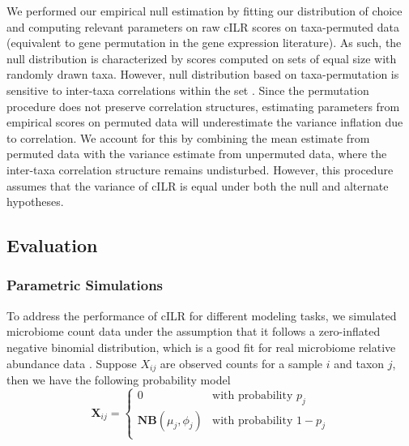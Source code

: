\documentclass[10pt,letterpaper]{article}
\begin{document}
We performed our empirical null estimation by fitting our distribution of choice and computing relevant parameters on raw cILR scores on taxa-permuted data (equivalent to gene permutation in the gene expression literature). As such, the null distribution is characterized by scores computed on sets of equal size with randomly drawn taxa. However, null distribution based on taxa-permutation is sensitive to inter-taxa correlations within the set \cite{wu2012}. Since the permutation procedure does not preserve correlation structures, estimating parameters from empirical scores on permuted data will underestimate the variance inflation due to correlation. We account for this by combining the mean estimate from permuted data with the variance estimate from unpermuted data, where the inter-taxa correlation structure remains undisturbed. However, this procedure assumes that the variance of cILR is equal under both the null and alternate hypotheses. 

\subsection*{Evaluation}
\subsubsection*{Parametric Simulations}  
To address the performance of cILR for different modeling tasks, we simulated microbiome count data under the assumption that it follows a zero-inflated negative binomial distribution, which is a good fit for real microbiome relative abundance data \cite{calgaro2020}. Suppose $X_{ij}$ are observed counts for a sample $i$ and taxon $j$, then we have the following probability model
\begin{equation}
    \mathbf{X}_{ij} =
      \begin{cases}
        0 & \text{with probability $p_j$}\\
        \mathbf{NB}(\mu_j, \phi_j) & \text{with probability $1 - p_j$}\\
      \end{cases}       
\end{equation}
\end{document}
